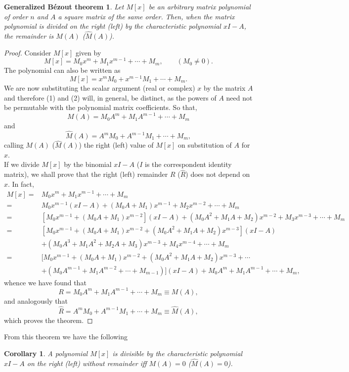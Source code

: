 \documentclass[12pt]{article}
\newtheorem{cor*}{Corollary}
\newtheorem{theorem*}{Generalized B\'ezout theorem}
\begin{document}
\begin{theorem*} Let $M[x]$ be an arbitrary matrix polynomial of order $n$ and $A$ a square matrix of the same order. Then, when the matrix polynomial is divided on the right (left) by the characteristic polynomial $xI-A$, the remainder is $M(A)$ ($\widehat{M}(A)$). 
\end{theorem*}
\begin{proof} 
Consider $M[x]$ given by
\begin{equation}
M[x] = M_0 x^m + M_1 x^{m-1} + \cdots + M_m, \qquad (M_0\neq 0).
\end{equation}
The polynomial can also be written as
\begin{equation}
M[x]=x^mM_0+x^{m-1}M_1+\cdots +M_m.
\end{equation}
We are now substituting the scalar argument (real or complex) $x$ by the matrix $A$ and therefore (1) and (2) will, in general, be distinct, as the powers of $A$ need not be permutable with the polynomial matrix coefficients. So that,
\begin{equation*}
M(A) = M_0 A^m + M_1 A^{m-1} + \cdots + M_m
\end{equation*}
and
\begin{equation*}
\widehat{M}(A)=A^mM_0+A^{m-1}M_1+\cdots +M_m,
\end{equation*}
calling $M(A)$ ($\widehat{M}(A)$) the right (left) value of $M[x]$ on substitution of $A$ for $x$. \\
If we divide $M[x]$ by the binomial $xI-A$ ($I$ is the correspondent  identity matrix), we shall prove that the right (left) remainder $R$ ($\widehat{R}$) does not depend on $x$. In fact,
\begin{align*}
M[x]=& M_0 x^m + M_1 x^{m-1} + \cdots + M_m \\
    =& M_0 x^{m-1} (xI-A) + (M_0 A + M_1) x^{m-1} + M_2 x^{m-2} + \cdots + M_m \\
    =& [M_0 x^{m-1} + (M_0 A + M_1) x^{m-2}](xI-A) + (M_0A^2 + M_1A + M_2)x^{m-2} + M_3x^{m-3} + \cdots + M_m \\
    =& [M_0 x^{m-1} + (M_0A + M_1)x^{m-2} + (M_0A^2 + M_1A + M_2)x^{m-3}](xI-A) \\
     & + (M_0A^3 + M_1A^2 + M_2A + M_3)x^{m-3} + M_4x^{m-4} + \cdots + M_m \\
    =& [M_0 x^{m-1}+(M_0A+M_1)x^{m-2}+(M_0A^2+M_1A+M_2)x^{m-3}+\cdots \\
     & +(M_0A^{m-1}+M_1A^{m-2}+\cdots+M_{m-1})](xI-A) + M_0A^m+M_1A^{m-1}+\cdots+M_m, 
\end{align*}
whence we have found that
\begin{equation*}
R= M_0A^m+M_1A^{m-1}+\cdots+M_m\equiv M(A),
\end{equation*}
and analogously that
\begin{equation*}
\widehat{R}= A^mM_0+A^{m-1}M_1+\cdots+M_m\equiv \widehat{M}(A),
\end{equation*}
which proves the theorem.
\end{proof}
From this theorem we have the following
\begin{cor*}
A polynomial $M[x]$ is divisible by the characteristic polynomial $xI-A$ on the right (left) without remainder 
if\mbox{}f $M(A)=0$ ($\widehat{M}(A)=0$).
\end{cor*}

\end{document}

